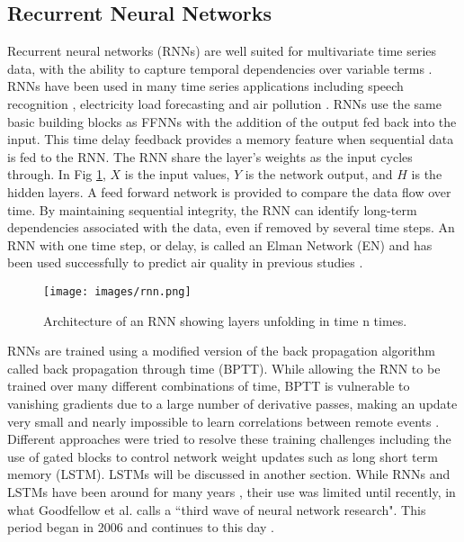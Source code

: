 \documentclass[preprint,12pt,authoryear]{elsarticle}
\begin{document}
\begin{linenumbers}
\subsection{Recurrent Neural Networks}
Recurrent neural networks (RNNs) are well suited for multivariate time series data, with the ability to capture temporal dependencies over variable terms \citep{Che2016}. RNNs have been used in many time series applications including speech recognition \citep{Graves2013}, electricity load forecasting \citep{Walid2017} and air pollution \citep{Gomez2003}. RNNs use the same basic building blocks as FFNNs with the addition of the output fed back into the input. This time delay feedback provides a memory feature when sequential data is fed to the RNN. The RNN share the layer's weights as the input cycles through. In Fig \ref{fig:rnn}, $X$ is the input values, $Y$ is the network output, and $H$ is the hidden layers. A feed forward network is provided to compare the data flow over time. By maintaining sequential integrity, the RNN can identify long-term dependencies associated with the data, even if removed by several time steps. An RNN with one time step, or delay, is called an Elman Network (EN) and has been used successfully to predict air quality in previous studies \citep{Biancofiore2015, Biancofiore2017}. 

%
\begin{figure}[H]
\centering
\texttt{[image: images/rnn.png]}  %
\caption{Architecture of an RNN showing layers unfolding in time n times.}
\label{fig:rnn}
\end{figure}
%

RNNs are trained using a modified version of the back propagation algorithm called back propagation through time (BPTT). While allowing the RNN to be trained over many different combinations of time, BPTT is vulnerable to vanishing gradients due to a large number of derivative passes, making an update very small and nearly impossible to learn correlations between remote events \citep{Pascanu2013, Graves2013a}. Different approaches were tried to resolve these training challenges including the use of gated blocks to control network weight updates such as long short term memory (LSTM). LSTMs will be discussed in another section. While RNNs and LSTMs have been around for many years \cite{Hochreiter1997}, their use was limited until recently, in what Goodfellow et al. calls a ``third wave of neural network research". This period began in 2006 and continues to this day \citep{Goodfellow2016}.


\end{linenumbers}
\end{document}
